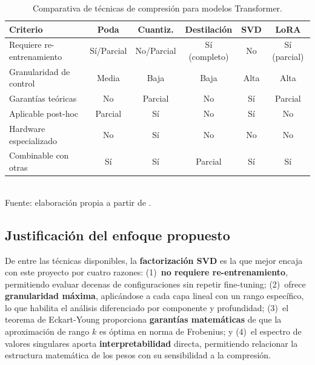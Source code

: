 \documentclass[11pt, a4paper]{article}
\begin{document}
\begin{table}[H]
    \centering
    \caption{Comparativa de técnicas de compresión para modelos Transformer.}
    \label{tab:comparativa}
    \small
    \begin{tabular}{@{}l c c c c c@{}}
        \toprule
        \textbf{Criterio} & \textbf{Poda} & \textbf{Cuantiz.} & \textbf{Destilación} & \textbf{SVD} & \textbf{LoRA} \\
        \midrule
        Requiere re-entrenamiento  & Sí/Parcial & No/Parcial & Sí (completo) & No   & Sí (parcial) \\
        Granularidad de control    & Media       & Baja       & Baja           & Alta & Alta \\
        Garantías teóricas         & No          & Parcial    & No             & Sí   & Parcial \\
        Aplicable post-hoc         & Parcial     & Sí         & No             & Sí   & No \\
        Hardware especializado     & No          & Sí         & No             & No   & No \\
        Combinable con otras       & Sí          & Sí         & Parcial        & Sí   & Sí \\
        \bottomrule
    \end{tabular}
    \\[0.15cm]{\small Fuente: elaboración propia a partir de \cite{ganesh2021compressing, hu2022lora}.}
\end{table}

\subsection{Justificación del enfoque propuesto}

De entre las técnicas disponibles, la \textbf{factorización SVD} es la que mejor encaja con este proyecto por cuatro razones: (1)~\textbf{no requiere re-entrenamiento}, permitiendo evaluar decenas de configuraciones sin repetir fine-tuning; (2)~ofrece \textbf{granularidad máxima}, aplicándose a cada capa lineal con un rango específico, lo que habilita el análisis diferenciado por componente y profundidad; (3)~el teorema de Eckart-Young \cite{eckart1936approximation} proporciona \textbf{garantías matemáticas} de que la aproximación de rango $k$ es óptima en norma de Frobenius; y (4)~el espectro de valores singulares aporta \textbf{interpretabilidad} directa, permitiendo relacionar la estructura matemática de los pesos con su sensibilidad a la compresión.
\end{document}
